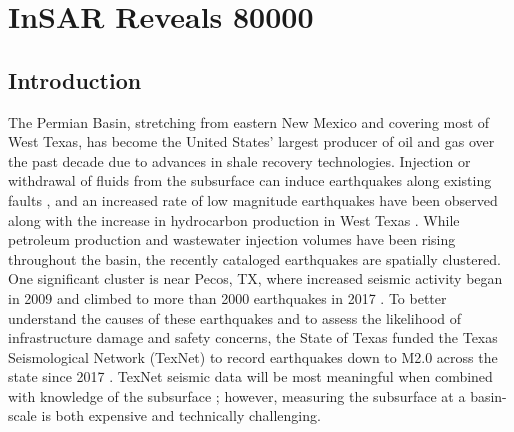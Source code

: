 \documentclass{utexasthesis}
\begin{document}
\chapter{InSAR Reveals 80000}
\label{chap-4-GRL}

\section{Introduction}


The Permian Basin, stretching from eastern New Mexico and covering most of West Texas, has become the United States' largest producer of oil and gas over the past decade due to advances in shale recovery technologies. Injection or withdrawal of fluids from the subsurface can induce earthquakes along existing faults \citep{Ellsworth2013InjectionInducedEarthquakes, Simpson1988TwoTypesReservoir}, and an increased rate of low magnitude earthquakes have been observed along with the increase in hydrocarbon production in West Texas \citep{Frohlich2016HistoricalReviewInduced, Atkinson2016HydraulicFracturingSeismicity, Frohlich2019OnsetCauseIncreased, Lomax2019ImprovingAbsoluteEarthquake, Savvaidis2020InducedSeismicityDelaware, Skoumal2020InducedSeismicityDelaware}. While petroleum production and wastewater injection volumes have been rising throughout the basin, the recently cataloged earthquakes are spatially clustered. One significant cluster is near Pecos, TX, where increased seismic activity began in 2009 and climbed to more than 2000 earthquakes in 2017 \citep{Frohlich2019OnsetCauseIncreased}. To better understand the causes of these earthquakes and to assess the likelihood of infrastructure damage and safety concerns, the State of Texas funded the Texas Seismological Network (TexNet) to record earthquakes down to M2.0 across the state since 2017 \citep{Savvaidis2019TexnetStatewideSeismological}. TexNet seismic data will be most meaningful when combined with knowledge of the subsurface \citep{Council2013InducedSeismicityPotential, TheAcademyofMedicine2017EnvironmentalCommunityImpacts}; however, measuring the subsurface at a basin-scale is both expensive and technically challenging.
\end{document}
